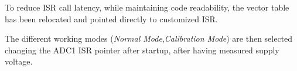 \documentclass[main]{subfiles}
\begin{document}
To reduce \ac{ISR} call latency, while maintaining code readability, the vector 
table has been relocated and pointed directly to customized \ac{ISR}.

The different working modes ({\it Normal Mode},{\it Calibration Mode}) are then 
selected changing the ADC1 \ac{ISR} pointer after startup, after having measured 
supply voltage.
\end{document}
